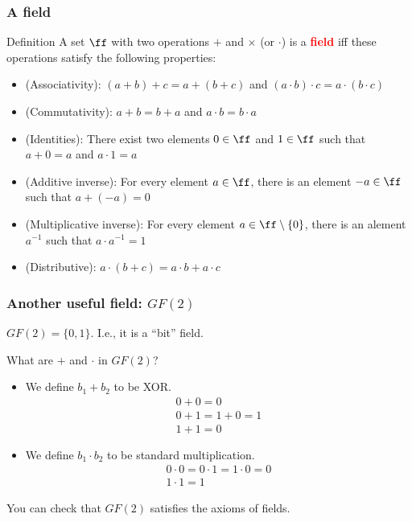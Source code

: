 \begin{frame}
  \frametitle{A field}

  \begin{block}{Definition}
    A set $\ff$ with two operations $+$ and $\times$ (or $\cdot$) is a
    \textcolor{red}{\bf field} iff these operations satisfy the
    following properties:
    \begin{itemize}
    \item (Associativity): $(a+b)+c = a+(b+c)$ and $(a\cdot b)\cdot c = a\cdot(b\cdot c)$
    \item (Commutativity): $a+b=b+a$ and $a\cdot b=b\cdot a$
    \item (Identities): There exist two elements $0\in\ff$ and $1\in\ff$ such that $a+0 = a$ and $a\cdot 1 = a$
    \item (Additive inverse): For every element $a\in \ff$, there is an element $-a\in \ff$ such that $a+(-a) = 0$
    \item (Multiplicative inverse): For every element $a\in \ff\setminus\{0\}$, there is an alement $a^{-1}$ such that $a\cdot a^{-1}=1$
    \item (Distributive): $a\cdot(b+c)=a\cdot b + a\cdot c$
    \end{itemize}
  \end{block}
\end{frame}

\begin{frame}
  \frametitle{Another useful field: $GF(2)$}
  $GF(2) = \{0,1\}$.  I.e., it is a ``bit'' field.

  What are $+$ and $\cdot$ in $GF(2)$?

  \pause

  \begin{itemize}
  \item We define $b_1+b_2$ to be XOR.
    \[
    \begin{array}{c}
      0 + 0 = 0 \\ 
      0 + 1 = 1 + 0 = 1 \\ 
      1 + 1 = 0
    \end{array}
    \] \pause
  \item We define $b_1\cdot b_2$ to be standard multiplication.
    \[
    \begin{array}{c}
      0 \cdot 0 = 0\cdot 1 = 1\cdot 0 = 0 \\
      1\cdot 1 = 1
    \end{array}
    \] 
    
  \end{itemize}

  You can check that $GF(2)$ satisfies the axioms of fields.
\end{frame}

